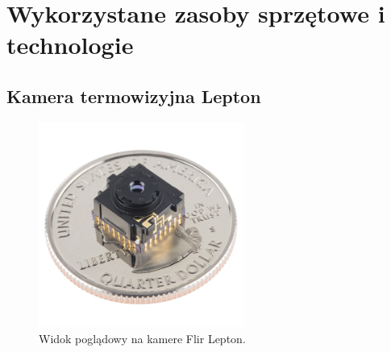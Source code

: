 
\chapter{Wykorzystane zasoby sprzętowe i technologie}
\section{Kamera termowizyjna Lepton}

\begin{figure}[h]
    \centering
    \includegraphics[width=0.6\textwidth]{images/Lepton}
    \caption{Widok poglądowy na kamere Flir Lepton.}
    \label{fig:lepton}
\end{figure}
 
